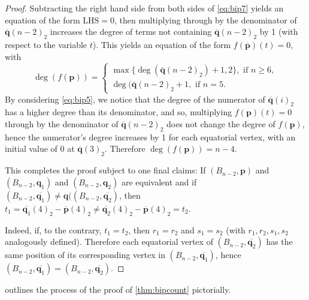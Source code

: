 \documentclass[11pt]{amsart}
\theoremstyle{definition}
\theoremstyle{remark}
\begin{document}
\begin{proof}
    Subtracting the right hand side from both sides of \cref{eq:bip7} yields an equation of the form $\text{LHS}=0$, then multiplying through by the denominator of $\overline{\mathbf{q}}(n-2)_2$ increases the degree of terms not containing $\overline{\mathbf{q}}(n-2)_2$ by 1 (with respect to the variable $t$).
    This yields an equation of the form $f(\overline{\mathbf{p}})(t)=0$, with
    \begin{equation*}
        \deg(f(\mathbf{p}))=\begin{cases}
            \max\{\deg(\overline{\mathbf{q}}(n-2)_2)+1,2\},\text{ if }n\geq 6,\\
            \deg(\overline{\mathbf{q}}(n-2)_2+1,\text{ if }n=5.
        \end{cases}
    \end{equation*}
    By considering \cref{eq:bip5}, we notice that the degree of the numerator of $\overline{\mathbf{q}}(i)_2$ has a higher degree than its denominator, and so, multiplying $f(\mathbf{p})(t)=0$ through by the denominator of $\overline{\mathbf{q}}(n-2)_2$ does not change the degree of $f(\mathbf{p})$, hence the numerator's degree increases by 1 for each equatorial vertex, with an initial value of 0 at $\overline{\mathbf{q}}(3)_2$.
    Therefore $\deg(f(\mathbf{p}))=n-4$.

    This completes the proof subject to one final claims:
        If $(B_{n-2},\mathbf{p})$ and $(B_{n-2},\mathbf{q}_1)$ and $(B_{n-2},\mathbf{q}_2)$ are equivalent and if $(B_{n-2},\overline{\mathbf{q}_1})\ne\mathbf{q}((B_{n-2},\overline{\mathbf{q}_2})$, then $t_1=\overline{\mathbf{q}_1}(4)_2-\overline{\mathbf{p}}(4)_2\neq\overline{\mathbf{q}_2}(4)_2-\overline{\mathbf{p}}(4)_2=t_2$.

        Indeed, if, to the contrary, $t_1=t_2$, then $r_1=r_2$ and $s_1=s_2$ (with $r_1,r_2,s_1,s_2$ analogously defined).
        Therefore each equatorial vertex of $(B_{n-2},\overline{\mathbf{q}_2})$ has the same position of its corresponding vertex in $(B_{n-2},\overline{\mathbf{q}_1})$, hence $(B_{n-2},\overline{\mathbf{q}_1})=(B_{n-2},\overline{\mathbf{q}_2})$.
\end{proof}

 outlines the process of the proof of \cref{thm:bipcount} pictorially.
\end{document}
